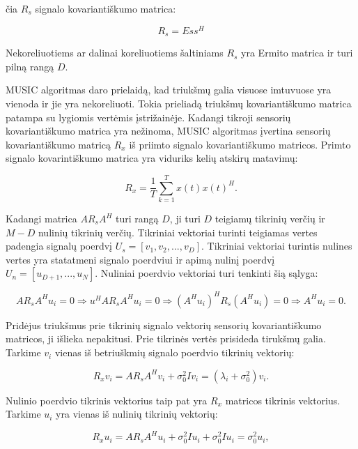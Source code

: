 \documentclass[main.tex]{subfiles}
\begin{document}
\noindent čia $R_s$ signalo kovariantiškumo matrica:

\begin{equation}
    R_s=E{ss^H}
\end{equation}

\noindent Nekoreliuotiems ar dalinai koreliuotiems šaltiniams $R_s$ yra Ermito matrica
ir turi pilną rangą $D$.

MUSIC algoritmas daro prielaidą, kad triukšmų galia visuose imtuvuose yra vienoda
ir jie yra nekoreliuoti. Tokia prieliadą triukšmų kovariantiškumo matrica patampa
su lygiomis vertėmis įstrižainėje. Kadangi tikroji sensorių kovariantiškumo matrica
yra nežinoma, MUSIC algoritmas įvertina sensorių kovariantiškumo matricą $R_x$
iš priimto signalo kovariantiškumo matricos. Primto signalo kovarintiškumo matrica
yra viduriks kelių atskirų matavimų:

\begin{equation}
    R_x = \frac{1}{T} \sum^T_{k=1} {x(t)x(t)^H}.
\end{equation}

Kadangi matrica $AR_sA^H$ turi rangą $D$, ji turi $D$ teigiamų tikrinių verčių ir
$M-D$ nulinių tikrinių verčių.
Tikriniai vektoriai turinti teigiamas vertes padengia signalų poerdvį $U_s=[v_1,v_2,...,v_D]$.
Tikriniai vektoriai turintis nulines vertes yra statatmeni signalo poerdviui ir apimą
nulinį poerdvį $U_n=[u_{D+1},...,u_N]$. Nuliniai poerdvio vektoriai turi tenkinti
šią sąlyga:

\begin{equation}
    AR_sA^Hu_i=0 \Rightarrow u^HAR_sA^Hu_i = 0 \Rightarrow (A^Hu_i)^HR_s(A^Hu_i)=0 \Rightarrow A^Hu_i=0.
\end{equation}

Pridėjus triukšmus prie tikrinių signalo vektorių sensorių kovariantiškumo matricos, ji
išlieka nepakitusi. Prie tikrinės vertės prisideda tirukšmų galia. Tarkime
$v_i$ vienas iš betriuškmių signalo poerdvio tikrinių vektorių:

\begin{equation}
    R_xv_i=AR_sA^Hv_i+\sigma^2_0Iv_i = (\lambda_i + \sigma^2_0)v_i.
\end{equation}

\noindent Nulinio poerdvio tikrinis vektorius taip pat yra $R_x$ matricos tikrinis
vektorius. Tarkime $u_i$ yra vienas iš nulinių tikrinių vektorių:

\begin{equation}
    R_xu_i=AR_sA^Hu_i+\sigma^2_0Iu_i+\sigma^2_0Iu_i=\sigma^2_0u_i,
\end{equation}
\end{document}
